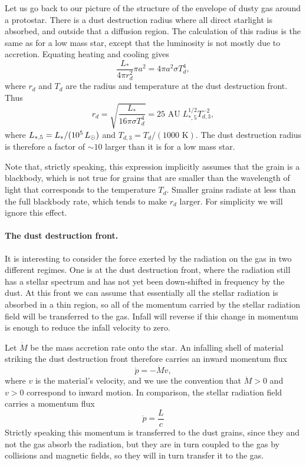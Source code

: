 Let us go back to our picture of the structure of the envelope of dusty gas around a protostar. There is a dust destruction radius where all direct starlight is absorbed, and outside that a diffusion region. The calculation of this radius is the same as for a low mass star, except that the luminosity is not mostly due to accretion. Equating heating and cooling gives
\begin{equation}
\frac{L_*}{4\pi r_d^2} \pi a^2 = 4\pi a^2 \sigma T_d^4,
\end{equation}
where $r_d$ and $T_d$ are the radius and temperature at the dust destruction front. Thus
\begin{equation}
r_d = \sqrt{\frac{L_*}{16 \pi \sigma T_d^4}} = 25\mbox{ AU}\; L_{*,5}^{1/2} T_{d,3}^{-2},
\end{equation}
where $L_{*,5} = L_*/(10^5\,L_{\odot})$ and $T_{d,3}=T_d/(1000\mbox{ K})$. The dust destruction radius is therefore a factor of $\sim 10$ larger than it is for a low mass star.

Note that, strictly speaking, this expression implicitly assumes that the grain is a blackbody, which is not true for grains that are smaller than the wavelength of light that corresponds to the temperature $T_d$. Smaller grains radiate at less than the full blackbody rate, which tends to make $r_d$ larger. For simplicity we will ignore this effect.

\paragraph{The dust destruction front.}

It is interesting to consider the force exerted by the radiation on the gas in two different regimes. One is at the dust destruction front, where the radiation still has a stellar spectrum and has not yet been down-shifted in frequency by the dust. At this front we can assume that essentially all the stellar radiation is absorbed in a thin region, so all of the momentum carried by the stellar radiation field will be transferred to the gas. Infall will reverse if this change in momentum is enough to reduce the infall velocity to zero.

Let $\dot{M}$ be the mass accretion rate onto the star. An infalling shell of material striking the dust destruction front therefore carries an inward momentum flux
\begin{equation}
\dot{p} = -\dot{M} v,
\end{equation}
where $v$ is the material's velocity, and we use the convention that $\dot{M}>0$ and $v>0$ correspond to inward motion. In comparison, the stellar radiation field carries a momentum flux
\begin{equation}
\dot{p} = \frac{L}{c}
\end{equation}
Strictly speaking this momentum is transferred to the dust grains, since they and not the gas absorb the radiation, but they are in turn coupled to the gas by collisions and magnetic fields, so they will in turn transfer it to the gas.

